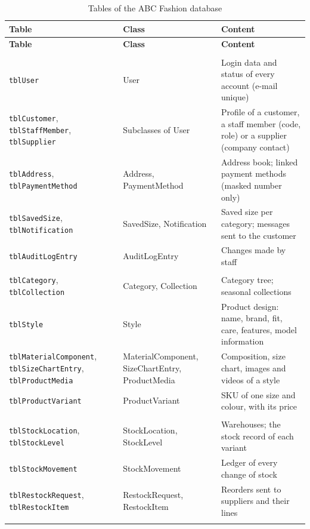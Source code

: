 {\small
\begin{xltabular}{\textwidth}{@{}L{4.4cm} L{3.2cm} Y@{}}
\caption{Tables of the ABC Fashion database}\label{tab:tablelist}\\
\toprule
\textbf{Table} & \textbf{Class} & \textbf{Content} \\ \midrule
\endfirsthead
\toprule
\textbf{Table} & \textbf{Class} & \textbf{Content} \\ \midrule
\endhead
\bottomrule
\endlastfoot
{} \\
\texttt{tblUser} & User & Login data and status of every account (e-mail unique) \\
\texttt{tblCustomer}, \texttt{tblStaffMember}, \texttt{tblSupplier} & Subclasses of User & Profile of a customer, a staff member (code, role) or a supplier (company contact) \\
\texttt{tblAddress}, \texttt{tblPaymentMethod} & Address, PaymentMethod & Address book; linked payment methods (masked number only) \\
\texttt{tblSavedSize}, \texttt{tblNotification} & SavedSize, Notification & Saved size per category; messages sent to the customer \\
\texttt{tblAuditLogEntry} & AuditLogEntry & Changes made by staff \\ \addlinespace
{} \\
\texttt{tblCategory}, \texttt{tblCollection} & Category, Collection & Category tree; seasonal collections \\
\texttt{tblStyle} & Style & Product design: name, brand, fit, care, features, model information \\
\texttt{tblMaterialComponent}, \texttt{tblSizeChartEntry}, \texttt{tblProductMedia} & MaterialComponent, SizeChartEntry, ProductMedia & Composition, size chart, images and videos of a style \\
\texttt{tblProductVariant} & ProductVariant & SKU of one size and colour, with its price \\ \addlinespace
{} \\
\texttt{tblStockLocation}, \texttt{tblStockLevel} & StockLocation, StockLevel & Warehouses; the stock record of each variant \\
\texttt{tblStockMovement} & StockMovement & Ledger of every change of stock \\
\texttt{tblRestockRequest}, \texttt{tblRestockItem} & RestockRequest, RestockItem & Reorders sent to suppliers and their lines \\ \addlinespace

\end{xltabular}}
